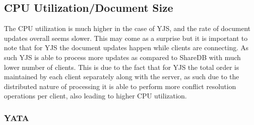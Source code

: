 \documentclass[12pt]{article}
\begin{document}
  \subsection{CPU Utilization/Document Size}
  The CPU utilization is much higher in the case of YJS, and the rate of document updates overall seems slower.
  This may come as a surprise but it is important to note that for YJS the document updates happen while
  clients are connecting. As such YJS is able to process more updates as compared to ShareDB with much lower
  number of clients. This is due to the fact that for YJS the total order is maintained by each client separately
  along with the server, as such due to the distributed nature of processing it is able to perform more conflict
  resolution operations per client, also leading to higher CPU utilization.
  \subsubsection{YATA}
\end{document}
